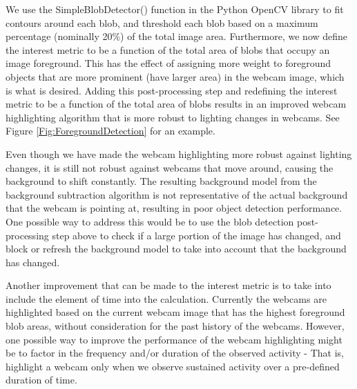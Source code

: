 \documentclass{article}
\begin{document}
We use the SimpleBlobDetector() function in the Python OpenCV library to fit
contours around each blob, and threshold each blob based on a maximum
percentage (nominally 20\%) of the total image area. Furthermore, we now define
the interest metric to be a function of the total area of blobs that occupy an
image foreground. This has the effect of assigning more weight to foreground
objects that are more prominent (have larger area) in the webcam image, which
is what is desired. Adding this post-processing step and redefining the
interest metric to be a function of the total area of blobs results in an
improved webcam highlighting algorithm that is more robust to lighting changes
in webcams. See Figure \ref{Fig:ForegroundDetection} for an example.

Even though we have made the webcam highlighting more robust against lighting
changes, it is still not robust against webcams that move around, causing the
background to shift constantly. The resulting background model from the
background subtraction algorithm is not representative of the actual background
that the webcam is pointing at, resulting in poor object detection performance.
One possible way to address this would be to use the blob detection
post-processing step above to check if a large portion of the image has
changed, and block or refresh the background model to take into account that
the background has changed.

Another improvement that can be made to the interest metric is to take into
include the element of time into the calculation. Currently the webcams are
highlighted based on the current webcam image that has the highest foreground
blob areas, without consideration for the past history of the webcams. However,
one possible way to improve the performance of the webcam highlighting might be
to factor in the frequency and/or duration of the observed activity - That is,
highlight a webcam only when we observe sustained activity over a pre-defined
duration of time. 
\end{document}
